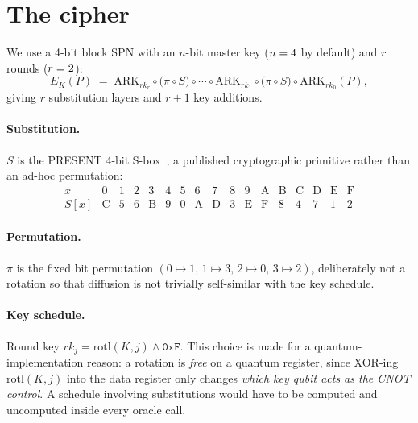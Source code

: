 \documentclass[11pt,a4paper]{article}
\newcommand{\Ek}{E_K}
\begin{document}
\section{The cipher}

We use a 4-bit block SPN with an $n$-bit master key ($n = 4$ by
default) and $r$ rounds ($r = 2$):
\begin{equation}
  \Ek(P) \;=\; \mathrm{ARK}_{rk_r} \circ \Big( \pi \circ S \Big) \circ \cdots
                \circ \mathrm{ARK}_{rk_1} \circ \Big( \pi \circ S \Big)
                \circ \mathrm{ARK}_{rk_0}(P),
\end{equation}
giving $r$ substitution layers and $r+1$ key additions.

\paragraph{Substitution.} $S$ is the PRESENT 4-bit
S-box~\citep{bogdanov2007}, a published cryptographic primitive rather than an
ad-hoc permutation:
\[
\begin{array}{c|cccccccccccccccc}
x    & 0 & 1 & 2 & 3 & 4 & 5 & 6 & 7 & 8 & 9 & \mathrm{A} & \mathrm{B} & \mathrm{C} & \mathrm{D} & \mathrm{E} & \mathrm{F}\\
\hline
S[x] & \mathrm{C} & 5 & 6 & \mathrm{B} & 9 & 0 & \mathrm{A} & \mathrm{D} & 3 & \mathrm{E} & \mathrm{F} & 8 & 4 & 7 & 1 & 2
\end{array}
\]

\paragraph{Permutation.} $\pi$ is the fixed bit permutation
$(0 \mapsto 1,\, 1 \mapsto 3,\, 2 \mapsto 0,\, 3 \mapsto 2)$, deliberately not a
rotation so that diffusion is not trivially self-similar with the key schedule.

\paragraph{Key schedule.} Round key $rk_j = \mathrm{rotl}(K, j) \wedge \mathtt{0xF}$.
This choice is made for a quantum-implementation reason: a rotation is
\emph{free} on a quantum register, since XOR-ing $\mathrm{rotl}(K,j)$ into the
data register only changes \emph{which key qubit acts as the CNOT control}. A
schedule involving substitutions would have to be computed and uncomputed
inside every oracle call.
\end{document}
